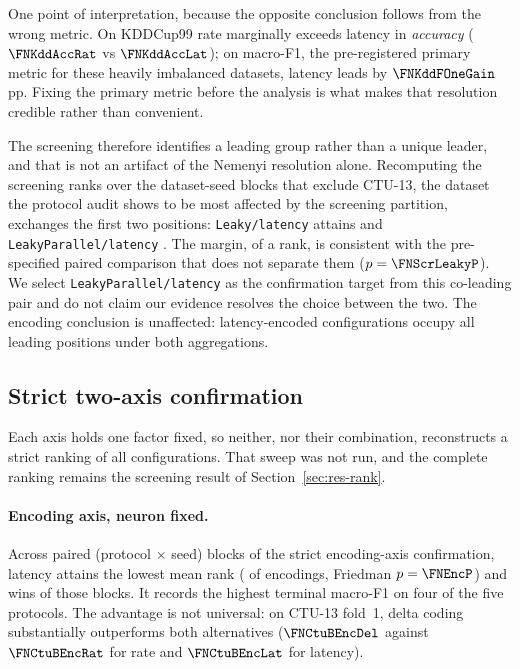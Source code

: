 One point of interpretation, because the opposite conclusion follows from the
wrong metric. On KDDCup99 rate marginally exceeds latency in \emph{accuracy}
($\FNKddAccRat$ vs $\FNKddAccLat$); on macro-F1, the pre-registered primary
metric for these heavily imbalanced datasets, latency leads by $\FNKddFOneGain$ pp. Fixing the primary
metric before the analysis is what makes that resolution credible rather than
convenient.

The screening therefore identifies a leading group rather than a unique leader,
and that is not an artifact of the Nemenyi resolution alone. Recomputing the
screening ranks over the \FNNoCtuBlocks{} dataset-seed blocks that exclude
CTU-13, the dataset the protocol audit shows to be most affected by the
screening partition, exchanges the first two positions: \texttt{Leaky/latency}
attains \FNNoCtuLeadRank{} and \texttt{LeakyParallel/latency}
\FNNoCtuChampRank. The margin, \FNNoCtuMargin{} of a rank, is consistent with
the pre-specified paired comparison that does not separate them
($p=\FNScrLeakyP$). We select \texttt{LeakyParallel/latency} as the confirmation
target from this co-leading pair and do not claim our evidence resolves the
choice between the two. The encoding conclusion is unaffected: latency-encoded
configurations occupy all \FNNoCtuLatTop{} leading positions under both
aggregations.

\subsection{Strict two-axis confirmation}
\label{sec:res-strict}

Each axis holds one factor fixed, so neither, nor their combination, reconstructs a strict ranking of all \FNScrVariants{} configurations. That sweep
was not run, and the complete ranking remains the screening result of
Section~\ref{sec:res-rank}.

\paragraph{Encoding axis, neuron fixed.}
Across \FNEncBlocks{} paired (protocol $\times$ seed) blocks of the strict
encoding-axis confirmation, latency attains the lowest mean rank
(\FNEncRank{} of \FNEncLevels{} encodings, Friedman $p=\FNEncP$) and wins
\FNEncWins{} of those blocks. It records the highest terminal macro-F1 on four
of the five protocols. The advantage is not universal: on CTU-13 fold~1, delta
coding substantially outperforms both alternatives ($\FNCtuBEncDel$ against
$\FNCtuBEncRat$ for rate and $\FNCtuBEncLat$ for latency).

